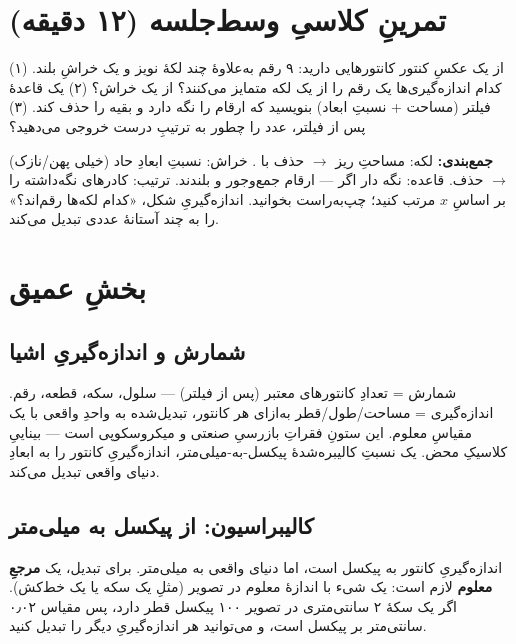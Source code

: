 \documentclass[12pt,a4paper]{article}
\begin{document}
\section{تمرینِ کلاسیِ وسط‌جلسه (۱۲ دقیقه)}

\begin{tamrin}
از یک عکسِ کنتور کانتورهایی دارید: ۹ رقم به‌علاوهٔ چند لکهٔ نویز و یک خراشِ بلند. (۱) کدام
اندازه‌گیری‌ها یک رقم را از یک لکه متمایز می‌کنند؟ از یک خراش؟ (۲) یک قاعدهٔ فیلتر (مساحت + نسبتِ
ابعاد) بنویسید که ارقام را نگه دارد و بقیه را حذف کند. (۳) پس از فیلتر، عدد را چطور به ترتیبِ درست
خروجی می‌دهید؟
\end{tamrin}

\textbf{جمع‌بندی:} لکه: مساحتِ ریز $\rightarrow$ حذف با . خراش: نسبتِ ابعادِ حاد (خیلی
پهن/نازک) $\rightarrow$ حذف. قاعده: نگه دار اگر  — ارقام جمع‌وجور و
بلندند. ترتیب: کادرهای نگه‌داشته را بر اساسِ $x$ مرتب کنید؛ چپ‌به‌راست بخوانید. اندازه‌گیریِ شکل،
«کدام لکه‌ها رقم‌اند؟» را به چند آستانهٔ عددی تبدیل می‌کند.

\section{بخشِ عمیق}

\subsection{شمارش و اندازه‌گیریِ اشیا}

شمارش = تعدادِ کانتورهای معتبر (پس از فیلتر) — سلول، سکه، قطعه، رقم. اندازه‌گیری = مساحت/طول/قطر
به‌ازای هر کانتور، تبدیل‌شده به واحدِ واقعی با یک مقیاسِ معلوم. این ستونِ فقراتِ بازرسیِ صنعتی و
میکروسکوپی است — بیناییِ کلاسیکِ محض. یک نسبتِ کالیبره‌شدهٔ پیکسل-به-میلی‌متر، اندازه‌گیریِ کانتور
را به ابعادِ دنیای واقعی تبدیل می‌کند.

\subsection{کالیبراسیون: از پیکسل به میلی‌متر}

اندازه‌گیریِ کانتور به پیکسل است، اما دنیای واقعی به میلی‌متر. برای تبدیل، یک \textbf{مرجعِ معلوم}
لازم است: یک شیء با اندازهٔ معلوم در تصویر (مثلِ یک سکه یا یک خط‌کش). اگر یک سکهٔ ۲ سانتی‌متری در
تصویر ۱۰۰ پیکسل قطر دارد، پس مقیاس ۰٫۰۲ سانتی‌متر بر پیکسل است، و می‌توانید هر اندازه‌گیریِ دیگر
را تبدیل کنید.
\end{document}
